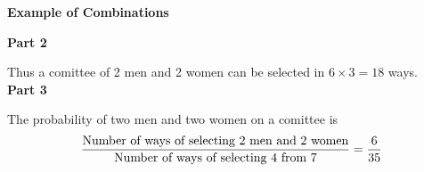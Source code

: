 \documentclass[]{report}
\begin{document}
	{
		\textbf{Example of Combinations}
		
		\textbf{Part 2}
		
		Thus a comittee of 2 men and 2 women can be selected in $ 6 \times 3  = 18 $ ways.\\
		\bigskip
		\textbf{Part 3}
		
		The probability of two men and two women on a comittee is 
		\[ {\mbox{Number of ways of selecting 2 men and 2 women} \over \mbox{Number of ways of selecting 4 from 7}} = {6 \over 35 }\]
		
	}
	
	
	
	
\end{document}
